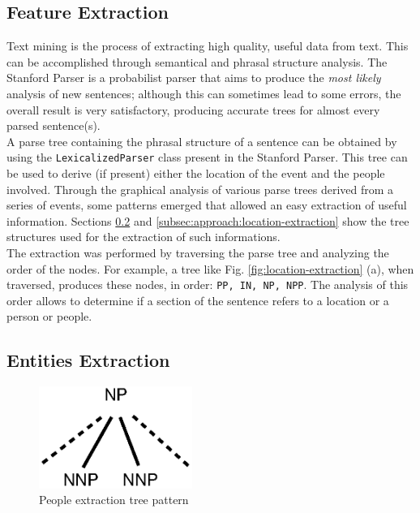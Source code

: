 \documentclass{llncs}
\begin{document}
\subsection{Feature Extraction}
\label{subsec:approach:nlp}

Text mining is the process of extracting high quality, useful data from text. This can be accomplished through semantical and phrasal structure analysis. The Stanford Parser is a probabilist parser that aims to produce the \textit{most likely} analysis of new sentences; although this can sometimes lead to some errors, the overall result is very satisfactory, producing accurate trees for almost every parsed sentence(s).\\

A parse tree containing the phrasal structure of a sentence can be obtained by using the \verb!LexicalizedParser! class present in the Stanford Parser. This tree can be used to derive (if present) either the location of the event and the people involved. Through the graphical analysis of various parse trees derived from a series of events, some patterns emerged that allowed an easy extraction of useful information. Sections \ref{subsec:approach:entities-extraction} and \ref{subsec:approach:location-extraction} show the tree structures used for the extraction of such informations.\cite{santorini}\cite{bies}\\

The extraction was performed by traversing the parse tree and analyzing the order of the nodes. For example, a tree like Fig. \ref{fig:location-extraction} (a), when traversed, produces these nodes, in order: \verb!PP, IN, NP, NPP!. The analysis of this order allows to determine if a section of the sentence refers to a location or a person or people.

\subsection{Entities Extraction}
\label{subsec:approach:entities-extraction}

\begin{figure}[h!]
	\centering
	\includegraphics[width=50mm]{dia/people.eps}
	\caption{People extraction tree pattern}
	\label{fig:people-extraction}
\end{figure}
\end{document}
